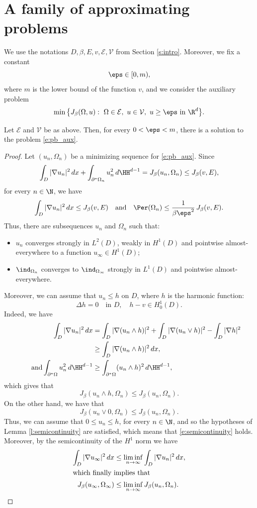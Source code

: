 \section{A family of approximating problems}\label{s:approx}
We use the notations $D,\beta,E,v, \mathcal E,\mathcal V$ from Section \ref{s:intro}. Moreover, we fix a constant
\[\eps\in[0,m),\]
where $m$ is the lower bound of the function $v$, and we consider the auxiliary problem
\begin{equation}\label{e:pb_aux}
\min\big\{J_\beta(\Omega,u):\ \Omega\in \mathcal E,\ u\in \mathcal V,\ u\ge \eps\ \text{in}\ \R^d\big\}.
\end{equation}

\begin{prop}\label{p:existence:aux}
Let $\mathcal E$ and $\mathcal V$ be as above.
Then, for every $0<\eps<m$, there is a solution to the problem \eqref{e:pb_aux}.
\end{prop}
\begin{proof}
Let $(u_n,\Omega_n)$ be a minimizing sequence for \eqref{e:pb_aux}. Since
\[\int_{D}|\nabla u_n|^2\,dx+\int_{\partial^\ast \Omega_n}u_n^2\,d\HH^{d-1}= J_\beta(u_n,\Omega_n)\le J_\beta(v,E),\]
for every $n\in\N$, we have
\[\int_{D}|\nabla u_n|^2\,dx\le J_\beta(v,E)\quad\text{and}\quad \Per(\Omega_n)\le \frac{1}{\beta \eps^2}\, J_\beta(v,E).\]
Thus, there are subsequences $u_n$ and $\Omega_n$ such that:
\begin{itemize}
\item $u_n$ converges strongly in $L^2(D)$, weakly in $H^1(D)$ and pointwise almost-everywhere to a function $u_\infty\in H^1(D)$;
\item $\ind_{\Omega_n}$ converges to $\ind_{\Omega_\infty}$ strongly in $L^1(D)$ and pointwise almost-everywhere.
\end{itemize}
Moreover, we can assume that $u_n\le h$ on $D$, where $h$ is the harmonic function:
\[\Delta h=0\quad\text{in } D,\quad h-v\in H^1_0(D).\]
Indeed, we have
\begin{align*}
\int_D|\nabla u_n|^2\,dx&=\int_D|\nabla (u_n\wedge h)|^2+\int_D|\nabla (u_n\vee h)|^2-\int_D|\nabla h|^2\\
&\ge \int_D|\nabla (u_n\wedge h)|^2\,dx,\\
\tag*{and} \int_{\partial^\ast\Omega}u_n^2\,d\HH^{d-1}&\ge \int_{\partial^\ast\Omega}(u_n\wedge h)^2\,d\HH^{d-1},
\end{align*}
which gives that
\[J_\beta (u_n\wedge h,\Omega_n)\le J_\beta (u_n,\Omega_n).\]
On the other hand, we have that
\[J_\beta(u_n\vee0,\Omega_n)\le J_\beta(u_n,\Omega_n).\]
Thus, we can assume that $0\le u_n\le h$, for every $n\in\N$, and so the hypotheses of Lemma \ref{l:semicontinuity} are satisfied, which means that \eqref{e:semicontinuity} holds.
Moreover, by the semicontinuity of the $H^1$ norm we have
\begin{align*}
\int_D|\nabla u_\infty|^2\,dx&\le \liminf_{n\to\infty}\int_D|\nabla u_n|^2\,dx,\\
\intertext{which finally implies that}
J_\beta (u_\infty,\Omega_\infty)&\le\liminf_{n\to\infty} J_\beta (u_n,\Omega_n).\qedhere
\end{align*}
\end{proof}

